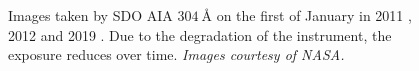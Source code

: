 \documentclass[11pt,a4paper,onecolumn]{report}
\begin{document}
\begin{figure}[t]%
  \centering
  \qquad
  \qquad
  \caption[]{Images taken by SDO AIA $\SI[]{304}[]{\angstrom}$ on the first of January in 2011
    , 2012  and 2019
    . Due to the degradation of the instrument, the
    exposure reduces over time. \textit{Images courtesy of NASA.}}
  \label{fig:aia_degradation}
\end{figure}
\end{document}
